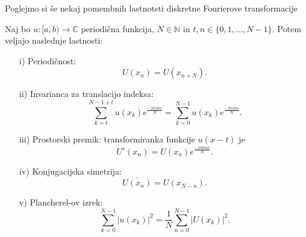 \documentclass[mat2, tisk]{fmfdelo}
\newcommand{\N}{\mathbb N}
\newcommand{\C}{\mathbb C}
\begin{document}
Poglejmo si še nekaj pomembnih lastnotsti diskretne Fourierove transformacije
\begin{trditev}
Naj bo $u: [a, b) \rightarrow \C$ periodična funkcija, $N\in \N$ in\quad
$t, n \in \{0, 1, \dots, N-1\}$. Potem veljajo naslednje lastnosti:
\begin{enumerate}
  \item[i)] Periodičnost:
  \begin{equation}
    U(x_n) = U(x_{n + N}).
  \end{equation}
  \item[ii)] Invarianca za translacijo indeksa:
  \begin{equation}
  \sum_{k=t}^{N-1 + t} u(x_k) e^{\frac{-2\pi i k n}{N}} = \sum_{k=0}^{N-1} u(x_k) e^{\frac{-2\pi i k n}{N}}.
\end{equation}
  \item[iii)] Prostorski premik: transformiranka funkcije $u(x - t)$ je
  \begin{equation}
  U^s(x_n) = U(x_n)e^{\frac{-2\pi k m t}{N}} .
\end{equation}
  \item[iv)] Konjugacijska simetrija: 
  \begin{equation}
    \overline{U(x_n)} = U(x_{N-n}).
  \end{equation}
  \item[v)] Plancherel-ov izrek:
  \begin{equation}
    \sum_{k=0}^{N-1} |u(x_k)|^2 = \frac{1}{N}\sum_{n=0}^{N-1} |U(x_k)|^2.
  \end{equation}
\end{enumerate}
\end{trditev}
\end{document}
